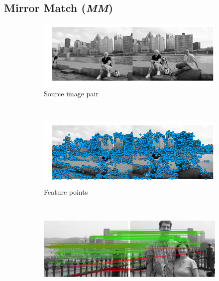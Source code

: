 \subsection{Mirror Match (\emph{MM})}
%
\begin{figure}[h]
    \centering%
        \begin{subfigure}[t]{0.5\columnwidth}
            \centering
            \includegraphics[width=0.95\columnwidth]{images/MMC_pitts_source}
            \caption{Source image pair}
            \label{fig:pitts_source}
        \end{subfigure}%
        ~ %
        \begin{subfigure}[t]{0.5\columnwidth}
            \centering
            \includegraphics[width=0.95\columnwidth]{images/MMC_pitts_keypoints}
            \caption{Feature points}
            \label{fig:pitts_keypoints}
        \end{subfigure}%
        \\ %
        \begin{subfigure}[t]{0.5\columnwidth}
            \centering
            \includegraphics[width=0.95\columnwidth]{images/mirror_match_off}

\end{subfigure}
\end{figure}
